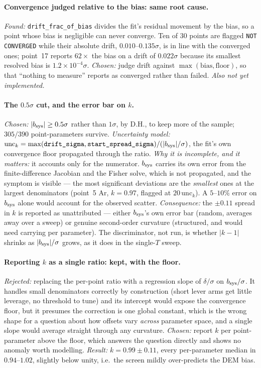\documentclass[11pt]{article}
\begin{document}
\paragraph{Convergence judged relative to the bias: same root cause.}
\emph{Found:} \texttt{drift\_frac\_of\_bias} divides the fit's residual movement
by the bias, so a point whose bias is negligible can never converge. Ten of 30
points are flagged \texttt{NOT CONVERGED} while their absolute drift,
$0.010$--$0.135\sigma$, is in line with the converged ones; point~17 reports
$62\times$ the bias on a drift of $0.022\sigma$ because its smallest resolved
bias is $1.2\times10^{-4}\sigma$. \emph{Chosen:} judge drift against
$\max(\text{bias},\text{floor})$, so that ``nothing to measure'' reports as
converged rather than failed. \emph{Also not yet implemented.}

\paragraph{The $0.5\sigma$ cut, and the error bar on $k$.} \emph{Chosen:}
$|b_{\rm sys}|\ge0.5\sigma$ rather than $1\sigma$, by D.H., to keep more of the
sample; $305/390$ point-parameters survive. \emph{Uncertainty model:}
$\mathrm{unc}_k=\max(\texttt{drift\_sigma},\texttt{start\_spread\_sigma})/
(|b_{\rm sys}|/\sigma)$, the fit's own convergence floor propagated through the
ratio. \emph{Why it is incomplete, and it matters:} it accounts only for the
numerator. $b_{\rm sys}$ carries its own error from the finite-difference
Jacobian and the Fisher solve, which is not propagated, and the symptom is
visible --- the most significant deviations are the \emph{smallest} ones at the
largest denominators (point~5 Ar, $k=0.97$, flagged at $20\,\mathrm{unc}_k$). A
$5$--$10\%$ error on $b_{\rm sys}$ alone would account for the observed scatter.
\emph{Consequence:} the $\pm0.11$ spread in $k$ is reported as unattributed ---
either $b_{\rm sys}$'s own error bar (random, averages away over a sweep) or
genuine second-order curvature (structured, and would need carrying per
parameter). The discriminator, not run, is whether $|k-1|$ shrinks as
$|b_{\rm sys}|/\sigma$ grows, as it does in the single-$T$ sweep.

\paragraph{Reporting $k$ as a single ratio: kept, with the floor.}
\emph{Rejected:} replacing the per-point ratio with a regression slope of
$\delta/\sigma$ on $b_{\rm sys}/\sigma$. It handles small denominators correctly
by construction (short lever arms get little leverage, no threshold to tune) and
its intercept would expose the convergence floor, but it presumes the correction
is one global constant, which is the wrong shape for a question about how
offsets vary \emph{across} parameter space, and a single slope would average
straight through any curvature. \emph{Chosen:} report $k$ per point-parameter
above the floor, which answers the question directly and shows no anomaly worth
modelling. \emph{Result:} $k=0.99\pm0.11$, every per-parameter median in
$0.94$--$1.02$, slightly below unity, i.e.\ the screen mildly over-predicts the
DEM bias.
\end{document}
